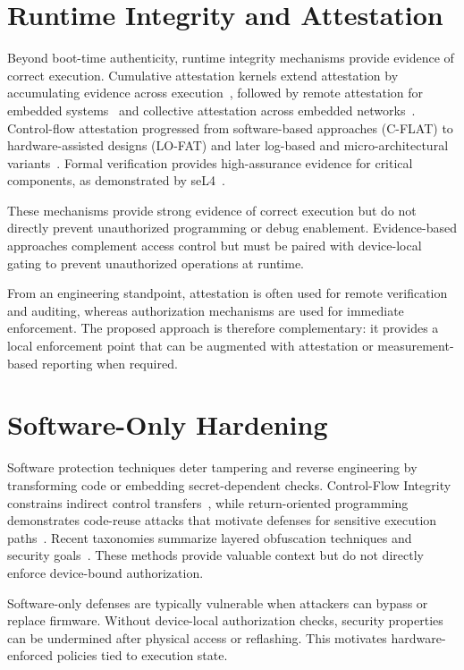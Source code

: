 \section{Runtime Integrity and Attestation}
Beyond boot-time authenticity, runtime integrity mechanisms provide evidence of correct execution.
Cumulative attestation kernels extend attestation by accumulating evidence across
execution~\cite{lemay2012cumulative}, followed by remote attestation for embedded
systems~\cite{kylanpaa2016remoteattest} and collective attestation across embedded
networks~\cite{ibrahim2018collectiveatt}. Control-flow attestation progressed from software-based
approaches (C-FLAT) to hardware-assisted designs (LO-FAT) and later log-based and
micro-architectural variants~\cite{abera2016cflat,dessouky2017lofat,liu2019logbasedcfa,benyehuda2022nanovised}.
Formal verification provides high-assurance evidence for critical components, as demonstrated by
seL4~\cite{klein2009sel4,klein2014tocs}.

These mechanisms provide strong evidence of correct execution but do not directly prevent
unauthorized programming or debug enablement. Evidence-based approaches complement access control
but must be paired with device-local gating to prevent unauthorized operations at runtime.

From an engineering standpoint, attestation is often used for remote verification and auditing,
whereas authorization mechanisms are used for immediate enforcement. The proposed approach is
therefore complementary: it provides a local enforcement point that can be augmented with
attestation or measurement-based reporting when required.

\section{Software-Only Hardening}
Software protection techniques deter tampering and reverse engineering by transforming code or
embedding secret-dependent checks. Control-Flow Integrity constrains indirect control
transfers~\cite{abadi2005cfi}, while return-oriented programming demonstrates code-reuse attacks
that motivate defenses for sensitive execution paths~\cite{checkoway2010rop}. Recent taxonomies
summarize layered obfuscation techniques and security goals~\cite{tran2020layered}. These methods
provide valuable context but do not directly enforce device-bound authorization.

Software-only defenses are typically vulnerable when attackers can bypass or replace firmware.
Without device-local authorization checks, security properties can be undermined after physical
access or reflashing. This motivates hardware-enforced policies tied to execution state.

